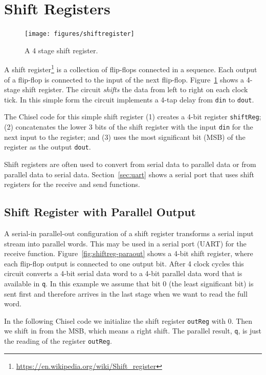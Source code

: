 \documentclass[%
    10pt,
    headinclude, footexclude,
    openright, %
    notitlepage,
    cleardoubleempty,
    headsepline,
    pointlessnumbers,
    bibtotoc, idxtotoc,
    ]{scrbook}
\newcommand{\code}[1]{{\small{\texttt{#1}}}}
\newcommand{\myref}[2]{\href{#1}{#2}}
\renewcommand{\myref}[2]{{#2}{\footnote{\url{#1}}}}
\begin{document}
\section{Shift Registers}

\begin{figure}
  \centering
  \texttt{[image: figures/shiftregister]}
  \caption{A 4 stage shift register.}
  \label{fig:shiftregister}
\end{figure}


A \myref{https://en.wikipedia.org/wiki/Shift_register}{shift register} is a collection of flip-flops
connected in a sequence. Each output of a flip-flop is connected to the input of the
next flip-flop. Figure~\ref{fig:shiftregister} shows a 4-stage shift register.
The circuit \emph{shifts} the data from left to right on each clock tick. In this simple form the
circuit implements a 4-tap delay from \code{din} to \code{dout}.

The Chisel code for this simple shift register (1) creates a 4-bit register \code{shiftReg};
(2) concatenates the lower 3 bits of the shift register with the input \code{din} for the next
input to the register; and (3) uses the most significant bit (MSB) of the register as the output \code{dout}.


Shift registers are often used to convert from serial data to parallel data or from parallel data
to serial data. Section~\ref{sec:uart} shows a serial port that uses shift registers for the receive and
send functions.

\subsection{Shift Register with Parallel Output}

A serial-in parallel-out configuration of a shift register transforms a serial input stream into parallel
words. This may be used in a serial port (UART) for the receive function.
Figure~\ref{fig:shiftreg-paraout} shows a 4-bit shift register, where each flip-flop output
is connected to one output bit. After 4 clock cycles this circuit converts a 4-bit serial data word
to a 4-bit parallel data word that is available in \code{q}. In this example we assume that bit 0
(the least significant bit) is sent first and therefore arrives in the last stage when we want to read
the full word.

In the following Chisel code we initialize the shift register \code{outReg} with 0. Then we shift in from the
MSB, which means a right shift. The parallel result, \code{q}, is just the reading of the register
\code{outReg}.
\end{document}
